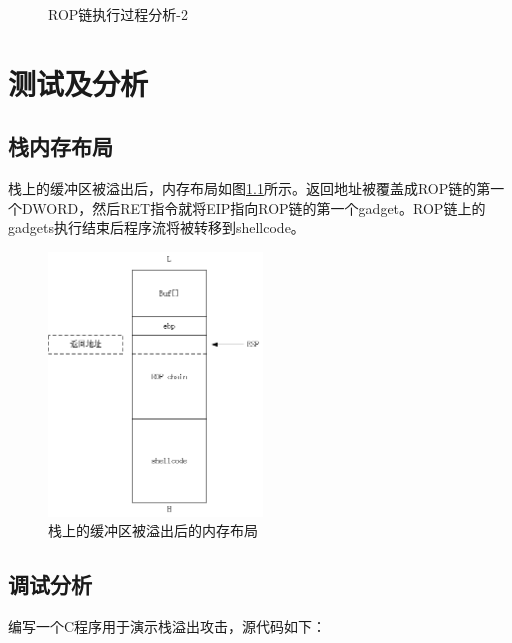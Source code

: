 \documentclass[bachelor]{thesis-uestc}
\begin{document}
\begin{figure}[H]
{		\label{fig:rop_chain_s23}}
	\caption{ROP链执行过程分析-2} %
\end{figure}

\chapter{测试及分析}
\section{栈内存布局}
栈上的缓冲区被溢出后，内存布局如图\ref{fig:stack2}所示。返回地址被覆盖成ROP链的第一个DWORD，然后RET指令就将EIP指向ROP链的第一个gadget。ROP链上的gadgets执行结束后程序流将被转移到shellcode。

\begin{figure}[htbp]
	\centering\includegraphics[height=7cm]{images/stack2.png}
	\caption{栈上的缓冲区被溢出后的内存布局}
	\label{fig:stack2}
\end{figure}

\section{调试分析}
编写一个C程序用于演示栈溢出攻击，源代码如下：
\end{document}
